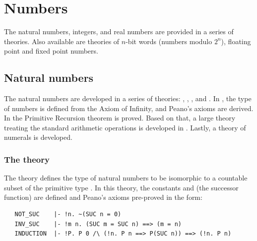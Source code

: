 \section{Numbers}

The natural numbers, integers, and real numbers are provided in a
series of theories. Also available are theories of $n$-bit words
(numbers modulo $2^n$), floating point and fixed point numbers.

\subsection{Natural numbers}

The natural numbers are developed in a series of theories:
, , , and
. In , the type of numbers is
defined from the Axiom of Infinity, and Peano's axioms are derived. In
 the Primitive Recursion theorem is proved. Based
on that, a large theory treating the standard arithmetic operations is
developed in . Lastly, a theory of numerals is
developed.

\subsubsection{The theory }

The theory 
defines the type  of natural numbers to be
isomorphic to a countable subset of the primitive type .  In this
theory, the constants 
and  (the successor function) are defined
and Peano's axioms
%
%
%
pre-proved in the form:

\begin{hol}
\begin{verbatim}
   NOT_SUC    |- !n. ~(SUC n = 0)
   INV_SUC    |- !m n. (SUC m = SUC n) ==> (m = n)
   INDUCTION  |- !P. P 0 /\ (!n. P n ==> P(SUC n)) ==> (!n. P n)
\end{verbatim}
\end{hol}

